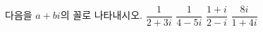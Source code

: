 다음을 $a+bi$의 꼴로 나타내시오. 
 $\dfrac{1}{2+3i}$
 $\dfrac{1}{4-5i}$
 $\dfrac{1+i}{2-i}$
 $\dfrac{8i}{1+4i}$
